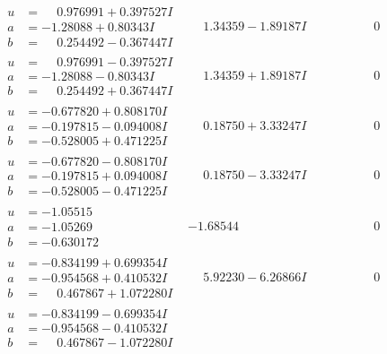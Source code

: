 \documentclass[1p]{elsarticle_modified}
\theoremstyle{definition}
\begin{document}
$$\begin{array}{c|c|c}
\begin{aligned}
u &= \phantom{-}0.976991 + 0.397527 I \\
a &= -1.28088 + 0.80343 I \\
b &= \phantom{-}0.254492 - 0.367447 I\end{aligned}
 & \phantom{-}1.34359 - 1.89187 I & \phantom{-0.000000 } 0 \\ \hline\begin{aligned}
u &= \phantom{-}0.976991 - 0.397527 I \\
a &= -1.28088 - 0.80343 I \\
b &= \phantom{-}0.254492 + 0.367447 I\end{aligned}
 & \phantom{-}1.34359 + 1.89187 I & \phantom{-0.000000 } 0 \\ \hline\begin{aligned}
u &= -0.677820 + 0.808170 I \\
a &= -0.197815 - 0.094008 I \\
b &= -0.528005 + 0.471225 I\end{aligned}
 & \phantom{-}0.18750 + 3.33247 I & \phantom{-0.000000 } 0 \\ \hline\begin{aligned}
u &= -0.677820 - 0.808170 I \\
a &= -0.197815 + 0.094008 I \\
b &= -0.528005 - 0.471225 I\end{aligned}
 & \phantom{-}0.18750 - 3.33247 I & \phantom{-0.000000 } 0 \\ \hline\begin{aligned}
u &= -1.05515\phantom{ +0.000000I} \\
a &= -1.05269\phantom{ +0.000000I} \\
b &= -0.630172\phantom{ +0.000000I}\end{aligned}
 & -1.68544\phantom{ +0.000000I} & \phantom{-0.000000 } 0 \\ \hline\begin{aligned}
u &= -0.834199 + 0.699354 I \\
a &= -0.954568 + 0.410532 I \\
b &= \phantom{-}0.467867 + 1.072280 I\end{aligned}
 & \phantom{-}5.92230 - 6.26866 I & \phantom{-0.000000 } 0 \\ \hline\begin{aligned}
u &= -0.834199 - 0.699354 I \\
a &= -0.954568 - 0.410532 I \\
b &= \phantom{-}0.467867 - 1.072280 I\end{aligned}

\end{array}$$
\end{document}
